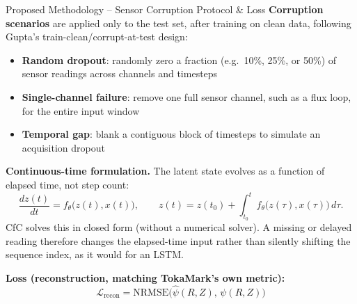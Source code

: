 \documentclass[aspectratio=169]{beamer}
\begin{document}
\begin{frame}{Proposed Methodology -- Sensor Corruption Protocol \& Loss}
  \small
  \textbf{Corruption scenarios} are applied only to the test set, after
  training on clean data, following Gupta's train-clean/corrupt-at-test
  design:
  \begin{itemize}
    \setlength\itemsep{2pt}
    \item \textbf{Random dropout}: randomly zero a fraction (e.g.\ 10\%,
      25\%, or 50\%) of sensor readings across channels and timesteps
    \item \textbf{Single-channel failure}: remove one full sensor channel,
      such as a flux loop, for the entire input window
    \item \textbf{Temporal gap}: blank a contiguous block of timesteps to
      simulate an acquisition dropout
  \end{itemize}

  \vspace{4pt}
  \textbf{Continuous-time formulation.} The latent state evolves as a
  function of elapsed time, not step count:
  \[
    \frac{dz(t)}{dt} = f_\theta\big(z(t), x(t)\big), \qquad
    z(t) = z(t_0) + \int_{t_0}^{t} f_\theta\big(z(\tau), x(\tau)\big)\, d\tau .
  \]
  CfC solves this in closed form (without a numerical solver). A missing or
  delayed reading therefore changes the elapsed-time input rather than
  silently shifting the sequence index, as it would for an LSTM.

  \vspace{4pt}
  \textbf{Loss (reconstruction, matching TokaMark's own metric):}
  \[
    \mathcal{L}_{\text{recon}} = \text{NRMSE}\big(\hat{\psi}(R,Z),\, \psi(R,Z)\big)
  \]
\end{frame}

\end{document}
